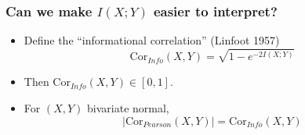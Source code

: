 \documentclass{beamer}
\begin{document}

\begin{frame}
\frametitle{Can we make $I(X; Y)$ easier to interpret?}
\begin{itemize}
\item Define the ``informational correlation'' (Linfoot 1957)
\[
\text{Cor}_{Info}(X, Y) = \sqrt{1-e^{-2I(X; Y)}}
\]\pause
\item Then $\text{Cor}_{Info}(X, Y) \in [0,1]$.
\item For $(X, Y)$ bivariate normal,
\[
|\text{Cor}_{Pearson}(X, Y)| = \text{Cor}_{Info}(X, Y)
\]
\end{itemize}
\pause 
\end{frame}
\end{document}
